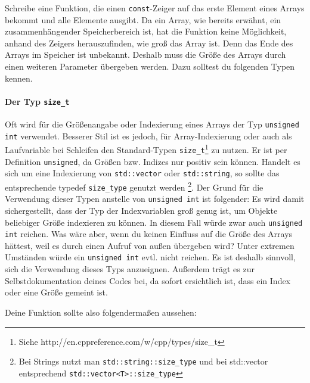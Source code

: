 Schreibe eine Funktion, die einen \lstinline{const}-Zeiger auf das erste Element eines Arrays bekommt und alle Elemente ausgibt.
Da ein Array, wie bereits erwähnt, ein zusammenhängender Speicherbereich ist, hat die Funktion keine Möglichkeit, anhand des Zeigers herauszufinden, wie groß das Array ist. 
Denn das Ende des Arrays im Speicher ist unbekannt. 
Deshalb muss die Größe des Arrays durch einen weiteren Parameter übergeben werden. Dazu solltest du folgenden Typen kennen.

\paragraph{Der Typ \lstinline$size_t$}
Oft wird für die Größenangabe oder Indexierung eines Arrays der Typ \lstinline{unsigned int} verwendet. 
Besserer Stil ist es jedoch, für Array-Indexierung oder auch als Laufvariable bei Schleifen den Standard-Typen \lstinline$size_t$\footnote{Siehe http://en.cppreference.com/w/cpp/types/size\_t} zu nutzen.
Er ist per Definition \lstinline$unsigned$, da Größen bzw. Indizes nur positiv sein können.
Handelt es sich um eine Indexierung von \lstinline{std::vector} oder \lstinline{std::string}, so sollte das entsprechende typedef \lstinline{size_type} genutzt werden
\footnote{Bei Strings nutzt man \lstinline$std::string::size_type$ und bei std::vector entsprechend \lstinline$std::vector<T>::size_type$}.
Der Grund für die Verwendung dieser Typen anstelle von \lstinline{unsigned int} ist folgender: 
Es wird damit sichergestellt, dass der Typ der Indexvariablen groß genug ist, um Objekte beliebiger Größe indexieren zu können.
In diesem Fall würde zwar auch \lstinline{unsigned int} reichen. 
Was wäre aber, wenn du keinen Einfluss auf die Größe des Arrays hättest, weil es durch einen Aufruf von außen übergeben wird?
Unter extremen Umständen würde ein \lstinline{unsigned int} evtl. nicht reichen.
Es ist deshalb sinnvoll, sich die Verwendung dieses Typs anzueignen.
Außerdem trägt es zur Selbstdokumentation deines Codes bei, da sofort ersichtlich ist, dass ein Index oder eine Größe gemeint ist.

Deine Funktion sollte also folgendermaßen aussehen:



